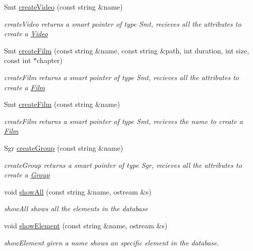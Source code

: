 \begin{DoxyCompactItemize}
Smt \mbox{\hyperlink{class_store_a86607684901d56a562eef093ece5d09e}{create\+Video}} (const string \&name)
\begin{DoxyCompactList}\small\item\em create\+Video returns a smart pointer of type Smt, recieves all the attributes to create a \mbox{\hyperlink{class_video}{Video}} \end{DoxyCompactList}\item 
Smt \mbox{\hyperlink{class_store_a34de901d3285715123d39663b2ffd166}{create\+Film}} (const string \&name, const string \&path, int duration, int size, const int $\ast$chapter)
\begin{DoxyCompactList}\small\item\em create\+Film returns a smart pointer of type Smt, recieves all the attributes to create a \mbox{\hyperlink{class_film}{Film}} \end{DoxyCompactList}\item 
Smt \mbox{\hyperlink{class_store_ab466abf10ca0fa808477fc9c097d5421}{create\+Film}} (const string \&name)
\begin{DoxyCompactList}\small\item\em create\+Film returns a smart pointer of type Smt, recieves the name to create a \mbox{\hyperlink{class_film}{Film}} \end{DoxyCompactList}\item 
Sgr \mbox{\hyperlink{class_store_a0be2d64e1f5104c0515330e180d700f1}{create\+Group}} (const string \&name)
\begin{DoxyCompactList}\small\item\em create\+Group returns a smart pointer of type Sgr, recieves all the attributes to create a \mbox{\hyperlink{class_group}{Group}} \end{DoxyCompactList}\item 
void \mbox{\hyperlink{class_store_a17e928204e65fbf4a2ddf0f091a6bb5c}{show\+All}} (const string \&name, ostream \&s)
\begin{DoxyCompactList}\small\item\em show\+All shows all the elements in the database \end{DoxyCompactList}\item 
void \mbox{\hyperlink{class_store_aca9d101ffa9d85c568e44036c719efa7}{show\+Element}} (const string \&name, ostream \&s)
\begin{DoxyCompactList}\small\item\em show\+Element given a name shows an specific element in the database. \end{DoxyCompactList}\item 

\end{DoxyCompactItemize}
